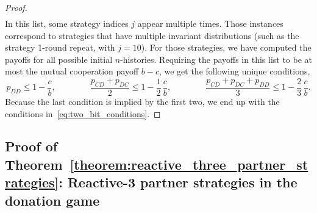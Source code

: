 \documentclass[11pt]{article}
\theoremstyle{plainCl1}
\theoremstyle{plainCl2}
\begin{document}
\begin{proof}
\begin{equation*}
\begin{array}{lcll}
  \end{array}
\end{equation*}
In this list, some strategy indices $j$ appear multiple times. 
Those instances correspond to strategies that have multiple invariant distributions (such as the strategy 1-round repeat, with $j\!=\!10$). For those strategies, we have computed the payoffs for all possible initial $n$-histories.  
Requiring the payoffs in this list to be at most the mutual cooperation payoff $b\! -\! c$, we get the following unique conditions,
\begin{equation*}
 p_{DD}  \le 1 \!-\! \frac{c}{b}, \qquad \qquad
\frac{p_{CD} + p_{DC}}{2}  \le 1\! -\! \frac{1}{2} \,  \frac{c}{b}, \qquad \qquad
 \frac{p_{CD} + p_{DC} + p_{DD}}{3} \le	 1 \!-\! \frac{2}{3} \, \frac{c}{b}.
\end{equation*}
Because the last condition is implied by the first two, we end up with the conditions in~\eqref{eq:two_bit_conditions}. 
\end{proof}




\subsection{Proof of Theorem~\ref{theorem:reactive_three_partner_strategies}: Reactive-3 partner strategies in the donation game}
\end{document}
